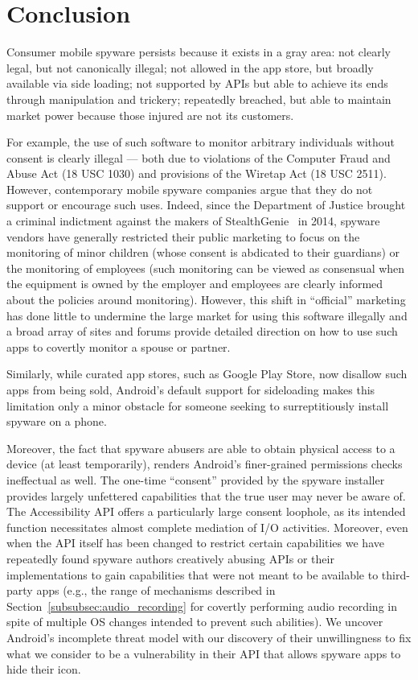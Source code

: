 \section{Conclusion}
Consumer mobile spyware persists because it exists in a gray area: not
clearly legal, but not canonically illegal; not allowed in the app
store, but broadly available via side loading; not supported by APIs
but able to achieve its ends through manipulation and trickery;
repeatedly breached, but able to maintain market power because those
injured are not its customers.

For example, the use of such software to monitor arbitrary individuals
without consent is clearly illegal --- both due to violations of the
Computer Fraud and Abuse Act (18 USC 1030) and provisions of the
Wiretap Act (18 USC 2511).  However, contemporary mobile spyware
companies argue that they do not support or encourage such uses.
Indeed, since the Department of Justice brought a criminal indictment
against the makers of StealthGenie~\cite{dojstealthgenie} in 2014,
spyware vendors have generally restricted their public marketing to
focus on the monitoring of minor children (whose consent is abdicated
to their guardians) or the monitoring of employees (such monitoring
can be viewed as consensual when the equipment is owned by the
employer and employees are clearly informed about the policies around
monitoring).  However, this shift in ``official'' marketing has done
little to undermine the large market for using this software illegally
and a broad array of sites and forums provide detailed direction on
how to use such apps to covertly monitor a spouse or partner.

Similarly, while curated app stores, such as Google Play Store, now
disallow such apps from being sold, Android's default support for
sideloading makes this limitation only a minor obstacle for someone
seeking to surreptitiously install spyware on a
phone.

Moreover, the fact that spyware abusers are able to obtain physical
access to a device (at least temporarily), renders Android's
finer-grained permissions checks ineffectual as well.  The one-time
``consent'' provided by the spyware installer provides largely
unfettered capabilities that the true user may never be aware of.  The
Accessibility API offers a particularly large consent loophole, as its
intended function necessitates almost complete mediation of I/O
activities.  Moreover, even when the API itself has been changed to
restrict certain capabilities we have repeatedly found spyware authors
creatively abusing APIs or their implementations to gain capabilities
that were not meant to be available to third-party apps
(e.g., the range of mechanisms described in
Section~\ref{subsubsec:audio_recording} for covertly performing audio
recording in spite of multiple OS changes intended to prevent such
abilities). We uncover Android's incomplete threat model
with our discovery of their unwillingness to fix what
we consider to be a vulnerability in their API that allows spyware apps to
hide their icon.

